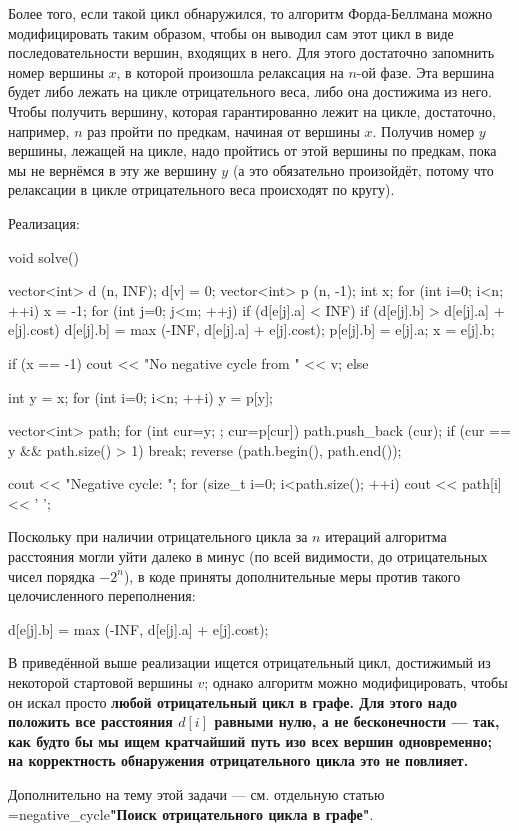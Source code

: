Более того, если такой цикл обнаружился, то алгоритм Форда-Беллмана можно модифицировать таким образом, чтобы он выводил сам этот цикл в виде последовательности вершин, входящих в него. Для этого достаточно запомнить номер вершины $x$, в которой произошла релаксация на $n$-ой фазе. Эта вершина будет либо лежать на цикле отрицательного веса, либо она достижима из него. Чтобы получить вершину, которая гарантированно лежит на цикле, достаточно, например, $n$ раз пройти по предкам, начиная от вершины $x$. Получив номер $y$ вершины, лежащей на цикле, надо пройтись от этой вершины по предкам, пока мы не вернёмся в эту же вершину $y$ (а это обязательно произойдёт, потому что релаксации в цикле отрицательного веса происходят по кругу).

Реализация:

\code
void solve() {
	vector<int> d (n, INF);
	d[v] = 0;
	vector<int> p (n, -1);
	int x;
	for (int i=0; i<n; ++i) {
		x = -1;
		for (int j=0; j<m; ++j)
			if (d[e[j].a] < INF)
				if (d[e[j].b] > d[e[j].a] + e[j].cost) {
					d[e[j].b] = max (-INF, d[e[j].a] + e[j].cost);
					p[e[j].b] = e[j].a;
					x = e[j].b;
				}
	}

	if (x == -1)
		cout << "No negative cycle from " << v;
	else {
		int y = x;
		for (int i=0; i<n; ++i)
			y = p[y];

		vector<int> path;
		for (int cur=y; ; cur=p[cur]) {
			path.push_back (cur);
			if (cur == y && path.size() > 1)  break;
		}
		reverse (path.begin(), path.end());
		
		cout << "Negative cycle: ";
		for (size_t i=0; i<path.size(); ++i)
			cout << path[i] << ' ';
	}
}
\endcode

Поскольку при наличии отрицательного цикла за $n$ итераций алгоритма расстояния могли уйти далеко в минус (по всей видимости, до отрицательных чисел порядка $-2^n$), в коде приняты дополнительные меры против такого целочисленного переполнения:

\code
d[e[j].b] = max (-INF, d[e[j].a] + e[j].cost);
\endcode

В приведённой выше реализации ищется отрицательный цикл, достижимый из некоторой стартовой вершины $v$; однако алгоритм можно модифицировать, чтобы он искал просто \bf{любой отрицательный цикл} в графе. Для этого надо положить все расстояния $d[i]$ равными нулю, а не бесконечности --- так, как будто бы мы ищем кратчайший путь изо всех вершин одновременно; на корректность обнаружения отрицательного цикла это не повлияет.

Дополнительно на тему этой задачи --- см. отдельную статью \algohref=negative_cycle{\bf{"Поиск отрицательного цикла в графе"}}.


